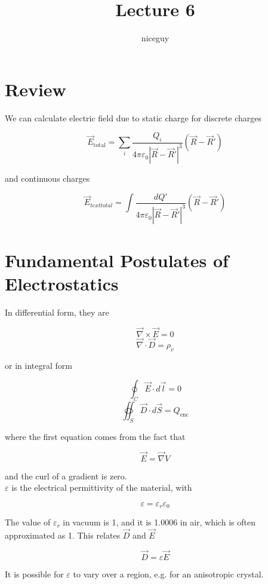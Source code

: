 \documentclass[12pt]{article}
\author{niceguy}
\title{Lecture 6}
\begin{document}
\maketitle

\section{Review}

We can calculate electric field due to static charge for discrete charges

$$\vec{E}_{\text{total}} = \sum_i \frac{Q_i}{4\pi\varepsilon_0|\vec{R}-\vec{R}'|^3}(\vec{R}-\vec{R}')$$

and continuous charges

$$\vec{E}_{text{total}} = \int \frac{dQ'}{4\pi\varepsilon_0|\vec{R}-\vec{R}'|^3}(\vec{R}-\vec{R}')$$

\section{Fundamental Postulates of Electrostatics}

In differential form, they are

$$\vec{\nabla}\times\vec{E} = 0$$
$$\vec{\nabla}\cdot\vec{D} = \rho_v$$

or in integral form

$$\oint_C \vec{E}\cdot d\vec{l} = 0$$
$$\oiint_S \vec{D}\cdot d\vec{S} = Q_{\mathrm{enc}}$$

where the first equation comes from the fact that

$$\vec{E} = \vec{\nabla}V$$

and the curl of a gradient is zero. \\

$\varepsilon$ is the electrical permittivity of the material, with

$$\varepsilon = \varepsilon_r\varepsilon_0$$

The value of $\varepsilon_r$ in vacuum is 1, and it is 1.0006 in air, which is often approximated as 1. This relates $\vec{D}$ and $\vec{E}$

$$\vec{D} = \varepsilon\vec{E}$$

It is possible for $\varepsilon$ to vary over a region, e.g. for an anisotropic crystal.
\end{document}
